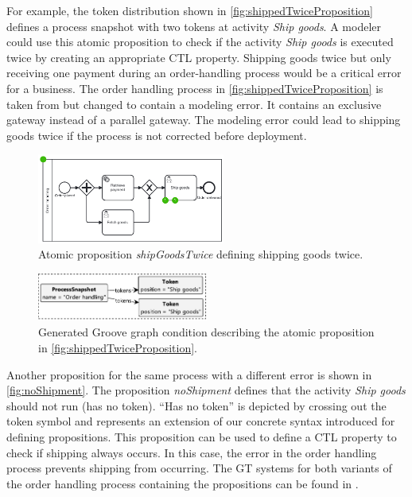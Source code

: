 \documentclass{lmcs} %
\begin{document}
For example, the token distribution shown in \autoref{fig:shippedTwiceProposition} defines a process snapshot with two tokens at activity \textit{Ship goods}.
A modeler could use this atomic proposition to check if the activity \textit{Ship goods} is executed twice by creating an appropriate CTL property.
Shipping goods twice but only receiving one payment during an order-handling process would be a critical error for a business.
The order handling process in \autoref{fig:shippedTwiceProposition} is taken from \cite{ruckerPracticalProcessAutomation2021} but changed to contain a modeling error.
It contains an exclusive gateway instead of a parallel gateway.
The modeling error could lead to shipping goods twice if the process is not corrected before deployment.

\begin{figure}[ht]
    \centering
    \includegraphics[width=0.55\textwidth]{images/shippedTwiceProposition.pdf}
    \caption{Atomic proposition \textit{shipGoodsTwice} defining shipping goods twice.}
    \label{fig:shippedTwiceProposition}
\end{figure}

\begin{figure}[ht]
    \centering
    \includegraphics[width=0.5\textwidth]{images/twice.pdf}
    \caption{Generated Groove graph condition describing the atomic proposition in \autoref{fig:shippedTwiceProposition}.}
    \label{fig:shippedTwiceGroove}
\end{figure}

Another proposition for the same process with a different error is shown in \autoref{fig:noShipment}.
The proposition \textit{noShipment} defines that the activity \textit{Ship goods} should not run (has no token).
\enquote{Has no token} is depicted by crossing out the token symbol and represents an extension of our concrete syntax introduced for defining propositions.
This proposition can be used to define a CTL property to check if shipping always occurs.
In this case, the error in the order handling process prevents shipping from occurring.
The GT systems for both variants of the order handling process containing the propositions can be found in \cite{timkrauterLMCS2024Artifacts2023}.
\end{document}
